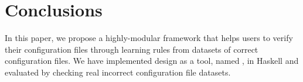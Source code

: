 
\section{Conclusions}

In this paper, we propose a highly-modular framework that helps 
users to verify their configuration files through learning
rules from datasets of correct configuration files.
We have implemented design as a tool, named \app, in Haskell 
and evaluated \app by checking real incorrect configuration file datasets.   
